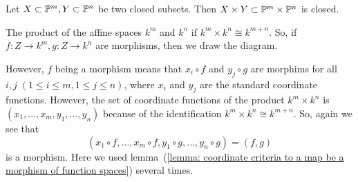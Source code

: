 \begin{dang}
    \begin{corollary}\label{corollary: product of closed subsets in the product of projective varieties}
        Let $X\subset \mathbb{P}^m, Y\subset \mathbb{P}^n$ be two closed subsets. Then 
        $X\times Y\subset \mathbb{P}^m\times \mathbb{P}^n$ is closed.
    \end{corollary}
\end{dang}

\begin{remark}
    The product of the affine spaces $k^m$ and $k^n$ if $k^{m}\times k^n\cong k^{m+n}$. So, if 
    $f:Z\to k^m,g:Z\to k^n$ are morphisms, then we draw the diagram.
    \begin{center}
    \end{center}
    However, $f$ being a morphism means that $x_i\circ f$ and $y_j\circ g$ are morphims for all 
    $i,j\;(1\leq i\leq m,1\leq j\leq n)$, where $x_i$ and $y_j$ are the standard coordinate functions. However, the 
    set of coordinate functions of the product $k^m\times k^n$ is $(x_1,\dots, x_m,y_1,\dots, y_n)$ because of the 
    identification $k^m\times k^n\cong k^{m+n}$. So, again we see that 
    \begin{equation}
        (x_1\circ f,\dots, x_m\circ f,y_1\circ g,\dots, y_n\circ g)=(f,g)
    \end{equation}
    is a morphism. Here we used lemma~(\ref{lemma: coordinate criteria to a map be a morphism of function spaces})
    several times.
\end{remark}
